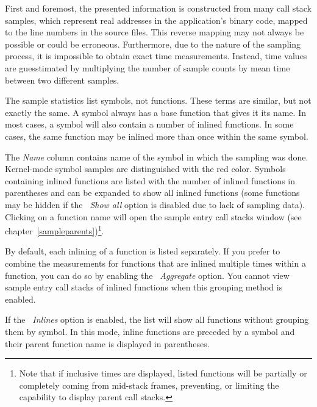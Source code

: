 \documentclass[hidelinks,titlepage,a4paper,twoside]{article}
\begin{document}
First and foremost, the presented information is constructed from many call stack samples, which represent real addresses in the application's binary code, mapped to the line numbers in the source files. This reverse mapping may not always be possible or could be erroneous. Furthermore, due to the nature of the sampling process, it is impossible to obtain exact time measurements. Instead, time values are guesstimated by multiplying the number of sample counts by mean time between two different samples.

The sample statistics list symbols, not functions. These terms are similar, but not exactly the same. A symbol always has a base function that gives it its name. In most cases, a symbol will also contain a number of inlined functions. In some cases, the same function may be inlined more than once within the same symbol.

The \emph{Name} column contains name of the symbol in which the sampling was done. Kernel-mode symbol samples are distinguished with the red color. Symbols containing inlined functions are listed with the number of inlined functions in parentheses and can be expanded to show all inlined functions (some functions may be hidden if the \emph{\faPuzzlePiece{}~Show all} option is disabled due to lack of sampling data). Clicking on a function name will open the sample entry call stacks window (see chapter~\ref{sampleparents})\footnote{Note that if inclusive times are displayed, listed functions will be partially or completely coming from mid-stack frames, preventing, or limiting the capability to display parent call stacks.}.

By default, each inlining of a function is listed separately. If you prefer to combine the measurements for functions that are inlined multiple times within a function, you can do so by enabling the \emph{\faLayerGroup{}~Aggregate} option. You cannot view sample entry call stacks of inlined functions when this grouping method is enabled.

If the \emph{\faSitemap{}~Inlines} option is enabled, the list will show all functions without grouping them by symbol. In this mode, inline functions are preceded by a \faCaretRight{} symbol and their parent function name is displayed in parentheses.
\end{document}
